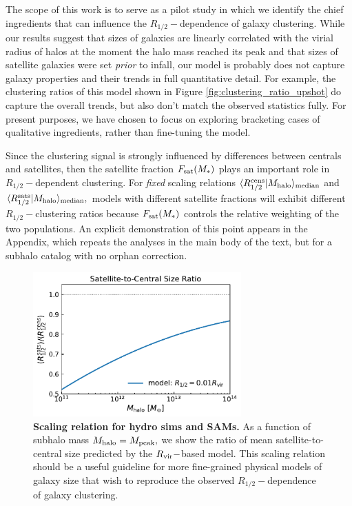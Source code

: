 \documentclass[usenatbib,usegraphicx,letterpaper]{mn2e}
\newcommand{\rhalf}{R_{1/2}}
\newcommand{\mstar}{M_{\ast}}
\newcommand{\mpeak}{M_{\rm peak}}
\newcommand{\mhalo}{M_{\rm halo}}
\newcommand{\rvir}{R_{\rm vir}}
\newcommand{\median}[2]{\langle{#1}\vert{#2}\rangle_{\rm median}}
\begin{document}
The scope of this work is to serve as a pilot study in which we identify the chief ingredients that can influence the $\rhalf-$dependence of galaxy clustering. While our results suggest that sizes of galaxies are linearly correlated with the
virial radius of halos at the moment the halo mass reached its peak and that sizes of satellite galaxies were set {\em prior} to infall, our model is probably does not capture galaxy properties and their trends in full quantitative detail. 
For example, the clustering ratios of this model shown in Figure \ref{fig:clustering_ratio_upshot} do capture the overall trends, but also don't match the observed statistics fully. 
 For present purposes, we have chosen to focus on exploring bracketing cases of qualitative ingredients, rather than fine-tuning the model.

Since the clustering signal is strongly influenced by differences between centrals and satellites, then the satellite fraction $F_{\rm sat}(\mstar)$ plays an important role in $\rhalf-$dependent clustering. For {\em fixed} scaling relations $\median{\rhalf^{\rm cens}}{\mhalo}$ and $\median{\rhalf^{\rm sats}}{\mhalo},$ models with different satellite fractions will exhibit different $\rhalf-$clustering ratios because $F_{\rm sat}(\mstar)$ controls the relative weighting of the two populations. An explicit demonstration of this point appears in the Appendix, which repeats the analyses in the main body of the text, but for a subhalo catalog with no orphan correction.

\begin{figure}
\centering
\includegraphics[width=8cm]{FIGS/cen_sat_size_ratios.pdf}
\caption{
{\bf Scaling relation for hydro sims and SAMs.}
As a function of subhalo mass $\mhalo=\mpeak,$ we show the ratio of mean satellite-to-central size predicted by the $\rvir-$based model. This scaling relation should be a useful guideline for more fine-grained physical models of galaxy size that wish to reproduce the observed $\rhalf-$dependence of galaxy clustering. 
}
\label{fig:censatsizeratios}
\end{figure}
\end{document}
